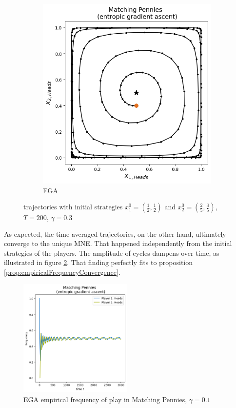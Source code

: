 \begin{figure}[H]
\begin{subfigure}{.5\textwidth}
    \includegraphics[width=\textwidth]{logos/Pennies6.png}
    \caption{EGA}
\end{subfigure}
\caption{trajectories with initial strategies $x_{1}^0 = (\frac{1}{2},\frac{1}{2})$ and $x_{2}^0 = (\frac{2}{5},\frac{3}{5})$, $T = 200$, $\gamma = 0.3$}
\label{fig:PenniesDivergence}
\end{figure}


As expected, the time-averaged trajectories, on the other hand, ultimately converge to the unique MNE. That happened independently from the initial strategies of the players. The amplitude of cycles dampens over time, as illustrated in figure \ref{fig:Pennies7}. That finding perfectly fits to proposition \ref{prop:empiricalFrequencyConvergence}.

\begin{figure}[H]
    \centering
    \includegraphics[width=0.5\textwidth]{logos/Pennies7.png}
    \caption{EGA empirical frequency of play in Matching Pennies, $\gamma = 0.1$}
    \label{fig:Pennies7}
\end{figure}


